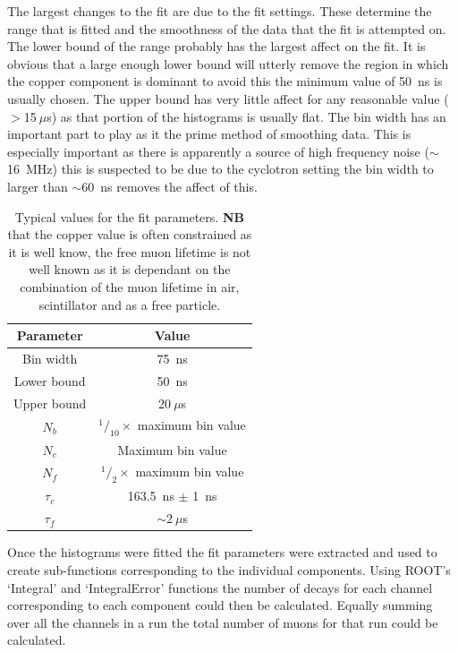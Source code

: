 \documentclass[]{article}
\newcommand{\ms}{$~\mu$s}
\begin{document}
The largest changes to the fit are due to the fit settings. These determine the range that is fitted and the smoothness of the data that the fit is attempted on. The lower bound of the range probably has the largest affect on the fit. It is obvious that a large enough lower bound will utterly remove the region in which the copper component is dominant to avoid this the minimum value of 50~ns is usually chosen. The upper bound has very little affect for any reasonable value ($>$15\ms) as that portion of the histograms is usually flat. The bin width has an important part to play as it the prime method of smoothing data. This is especially important as there is apparently a source of high frequency noise ($\sim$16~MHz) this is suspected to be due to the cyclotron setting the bin width to larger than $\sim$60~ns removes the affect of this.
\begin{table}
    \begin{center}
    \begin{tabular}{c | c}
        Parameter   & Value \\
        \hline
        Bin width   & 75~ns \\
        Lower bound & 50~ns \\
        Upper bound & 20\ms \\
        $N_{b}$     & $^1/_{10} \times$ maximum bin value \\
        $N_{c}$     & Maximum bin value\\
        $N_{f}$     & $^1/_{2} \times$ maximum bin value\\
        $\tau_{c}$  & 163.5~ns $\pm$ 1~ns\\
        $\tau_{f}$  & $\sim$2\ms\\
    \end{tabular}
    \end{center}
    \caption{Typical values for the fit parameters. \textbf{NB} that the copper value is often constrained as it is well know, the free muon lifetime is not well known as it is dependant on the combination of the muon lifetime in air, scintillator and as a free particle.}
    \label{tab:typical_fit_values}
\end{table}

Once the histograms were fitted the fit parameters were extracted and used to create sub-functions corresponding to the individual components. Using ROOT's `Integral' and `IntegralError' functions the number of decays for each channel corresponding to each component could then be calculated. Equally summing over all the channels in a run the total number of muons for that run could be calculated.
\end{document}
